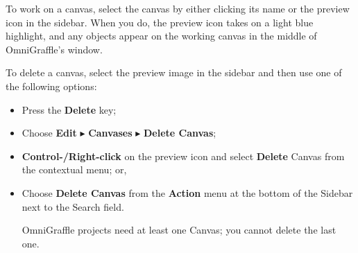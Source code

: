 \documentclass[../main.tex]{subfiles}
\begin{document}
To work on a canvas, select the canvas by either clicking its name or the preview icon in the
sidebar. When
you do, the preview icon takes on a light blue highlight, and any objects appear on the working
canvas in the
middle of OmniGraffle's window.

To delete a canvas, select the preview image in the sidebar and then use one of the following
options:
\begin{itemize}
  \item Press the \textbf{Delete} key;
  \item Choose \textbf{Edit} $\blacktriangleright$ \textbf{Canvases} $\blacktriangleright$
    \textbf{Delete Canvas};
  \item \textbf{Control-/Right-click} on the preview icon and select \textbf{Delete} Canvas from
    the
    contextual menu; or,
  \item Choose \textbf{Delete Canvas} from the \textbf{Action} menu at the bottom of the Sidebar
    next to the
    Search field.
    \begin{ognote}
      OmniGraffle projects need at least one Canvas; you cannot delete the last one.

    \end{ognote}
\end{itemize}
\end{document}

